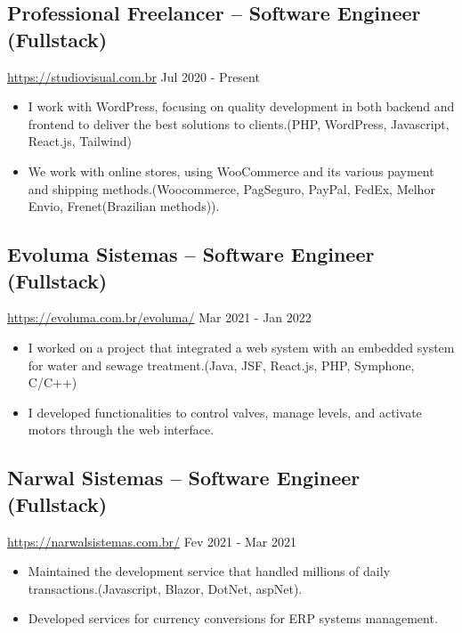 \documentclass[11pt, a4paper]{article}
\begin{document}
\subsection*{Professional Freelancer -- Software Engineer (Fullstack)}
\href{https://evoluma.com.br/evoluma/}{https://studiovisual.com.br} \hfill Jul 2020 - Present
\begin{itemize}[noitemsep]
    \item I work with WordPress, focusing on quality development in both backend and frontend to deliver the best solutions to clients.(PHP, WordPress, Javascript, React.js, Tailwind)
    \item We work with online stores, using WooCommerce and its various payment and shipping methods.(Woocommerce, PagSeguro, PayPal, FedEx, Melhor Envio, Frenet(Brazilian methods)).
\end{itemize}

\subsection*{Evoluma Sistemas -- Software Engineer (Fullstack)}
\href{https://evoluma.com.br/evoluma/}{https://evoluma.com.br/evoluma/} \hfill Mar 2021 - Jan 2022
\begin{itemize}[noitemsep]
    \item I worked on a project that integrated a web system with an embedded system for water and sewage treatment.(Java, JSF, React.js, PHP, Symphone, C/C++)
    \item I developed functionalities to control valves, manage levels, and activate motors through the web interface.
\end{itemize}

\subsection*{Narwal Sistemas -- Software Engineer (Fullstack)}
\href{https://www.narwalsistemas.com.br/}{https://narwalsistemas.com.br/} \hfill Fev 2021 - Mar 2021
\begin{itemize}[noitemsep]
    \item Maintained the development service that handled millions of daily transactions.(Javascript, Blazor, DotNet, aspNet).
    \item Developed services for currency conversions for ERP systems management.
\end{itemize}
\end{document}
